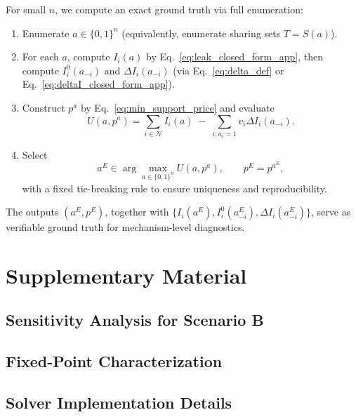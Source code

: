 \documentclass[lettersize,journal]{IEEEtran}
\begin{document}
For small $n$, we compute an exact ground truth via full enumeration:
\begin{enumerate}
\item Enumerate $a\in\{0,1\}^n$ (equivalently, enumerate sharing sets $T=S(a)$).
\item For each $a$, compute $I_i(a)$ by Eq.~\eqref{eq:leak_closed_form_app}, then compute $I_i^{0}(a_{-i})$ and $\Delta I_i(a_{-i})$ (via Eq.~\eqref{eq:delta_def} or Eq.~\eqref{eq:deltaI_closed_form_app}).
\item Construct $p^a$ by Eq.~\eqref{eq:min_support_price} and evaluate
\begin{equation}
U(a,p^a)=\sum_{i\in\mathcal{N}} I_i(a)\;-\;\sum_{i:a_i=1} v_i\Delta I_i(a_{-i}).
\label{eq:implementable_payoff_app}
\end{equation}
\item Select
\begin{equation}
a^{E}\in\arg\max_{a\in\{0,1\}^n} U(a,p^a),
\qquad p^{E}=p^{a^{E}},
\label{eq:eq_selection_app}
\end{equation}
with a fixed tie-breaking rule to ensure uniqueness and reproducibility.
\end{enumerate}

The outputs $(a^{E},p^{E})$, together with $\{I_i(a^{E}),I_i^{0}(a^{E}_{-i}),\Delta I_i(a^{E}_{-i})\}$, serve as verifiable ground truth for mechanism-level diagnostics.

\section{Supplementary Material}

\subsection{Sensitivity Analysis for Scenario B}
\label{app:sensitivity_b}


\subsection{Fixed-Point Characterization}
\label{app:fp_b}


\subsection{Solver Implementation Details}
\label{app:solver}

\end{document}
